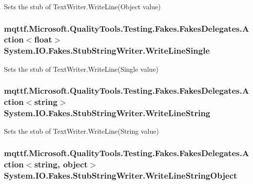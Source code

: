 Sets the stub of Text\-Writer.\-Write\-Line(\-Object value)

\hypertarget{class_system_1_1_i_o_1_1_fakes_1_1_stub_string_writer_ade7b74d1fcb743406ec33fb613245aab}{
\subsubsection[{Write\-Line\-Single}]{\setlength{\rightskip}{0pt plus 5cm}mqttf.\-Microsoft.\-Quality\-Tools.\-Testing.\-Fakes.\-Fakes\-Delegates.\-Action$<$float$>$ System.\-I\-O.\-Fakes.\-Stub\-String\-Writer.\-Write\-Line\-Single}}\label{class_system_1_1_i_o_1_1_fakes_1_1_stub_string_writer_ade7b74d1fcb743406ec33fb613245aab}


Sets the stub of Text\-Writer.\-Write\-Line(\-Single value)

\hypertarget{class_system_1_1_i_o_1_1_fakes_1_1_stub_string_writer_a391af2e21ddd03f8c85d593f05008b4b}{
\subsubsection[{Write\-Line\-String}]{\setlength{\rightskip}{0pt plus 5cm}mqttf.\-Microsoft.\-Quality\-Tools.\-Testing.\-Fakes.\-Fakes\-Delegates.\-Action$<$string$>$ System.\-I\-O.\-Fakes.\-Stub\-String\-Writer.\-Write\-Line\-String}}\label{class_system_1_1_i_o_1_1_fakes_1_1_stub_string_writer_a391af2e21ddd03f8c85d593f05008b4b}


Sets the stub of Text\-Writer.\-Write\-Line(\-String value)

\hypertarget{class_system_1_1_i_o_1_1_fakes_1_1_stub_string_writer_a899d54a0c7e6428114160872065bcb67}{
\subsubsection[{Write\-Line\-String\-Object}]{\setlength{\rightskip}{0pt plus 5cm}mqttf.\-Microsoft.\-Quality\-Tools.\-Testing.\-Fakes.\-Fakes\-Delegates.\-Action$<$string, object$>$ System.\-I\-O.\-Fakes.\-Stub\-String\-Writer.\-Write\-Line\-String\-Object}}\label{class_system_1_1_i_o_1_1_fakes_1_1_stub_string_writer_a899d54a0c7e6428114160872065bcb67}


